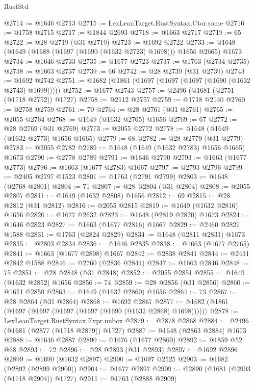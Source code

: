\begin{lexlean}{RustStd}
\begin{coremodule}
{\begin{coremodule}
{{{{{{{{{{{{{{{{{{{{{{{{{{{{{{{{{{{{{{{{{{{{@2714 := @1646 @2713
@2715 := LexLeanTarget.RustSyntax.Ctor.some
@2716 := @1758 @2715
@2717 := @1844 @2693
@2718 := @1663 @2717
@2719 := 65
@2722 := @28 @2719 (@31 @2719)
@2723 := @1692 @2722
@2733 := @1648 (@1649 (@1688 (@1697 (@1690 (@1632 @2723) @1698))) @1656 @2665) @1673
@2734 := @1646 @2733
@2735 := @1677 @2723
@2737 := @1763 (@2734 @2735)
@2738 := @1663 @2737
@2739 := 66
@2742 := @28 @2739 (@31 @2739)
@2743 := @1692 @2742
@2751 := @1682 (@1861 (@1697 (@1697 (@1697 (@1690 (@1632 @2743) @1699)))))
@2752 := @1677 @2743
@2757 := @2496 (@1681 (@2751 (@1718 @2752)) @1727)
@2758 := @2112 @2757
@2759 := @1718 @2140
@2760 := @2758 @2759
@2761 := 70
@2764 := @28 @2761 (@31 @2761)
@2765 := @2055 @2764
@2768 := @1649 (@1632 @2765) @1656
@2769 := 67
@2772 := @28 @2769 (@31 @2769)
@2773 := @2055 @2772
@2778 := @1648 (@1649 (@1632 @2773) @1656 @1665)
@2779 := 68
@2782 := @28 @2779 (@31 @2779)
@2783 := @2055 @2782
@2789 := @1648 (@1649 (@1632 @2783) @1656 @1665) @1673
@2790 := @2778 @2789
@2791 := @1646 @2790
@2793 := @1663 (@1677 @2773)
@2796 := @1663 (@1677 @2783) @1667
@2797 := @2793 @2796
@2799 := @2405 @2797 @1523
@2801 := @1763 (@2791 @2799)
@2803 := @1648 (@2768 @2801)
@2804 := 71
@2807 := @28 @2804 (@31 @2804)
@2808 := @2055 @2807
@2811 := @1649 (@1632 @2808) @1656
@2812 := 69
@2815 := @28 @2812 (@31 @2812)
@2816 := @2055 @2815
@2819 := @1649 (@1632 @2816) @1656
@2820 := @1677 @2632
@2823 := @1648 (@2819 @2820) @1673
@2824 := @1646 @2823
@2827 := @1663 (@1677 @2816) @1667
@2829 := @2460 @2827 @1588
@2831 := @1763 (@2824 @2829)
@2834 := @1648 (@2811 @2831) @1673
@2835 := @2803 @2834
@2836 := @1646 @2835
@2838 := @1663 (@1677 @2765)
@2841 := @1663 (@1677 @2808) @1667
@2842 := @2838 @2841
@2844 := @2431 @2842 @1588
@2846 := @2760 (@2836 @2844)
@2847 := @1663 @2846
@2848 := 75
@2851 := @28 @2848 (@31 @2848)
@2852 := @2055 @2851
@2855 := @1649 (@1632 @2852) @1656
@2856 := 74
@2859 := @28 @2856 (@31 @2856)
@2860 := @1651 @2859
@2863 := @1649 (@1632 @2860) @1656
@2864 := 73
@2867 := @28 @2864 (@31 @2864)
@2868 := @1692 @2867
@2877 := @1682 (@1861 (@1697 (@1697 (@1697 (@1697 (@1690 (@1632 @2868) @1698))))))
@2878 := LexLeanTarget.RustSyntax.Expr.unbox
@2879 := @2878 @2868
@2884 := @2496 (@1681 (@2877 (@1718 @2879)) @1727)
@2887 := @1648 (@2863 @2884) @1673
@2888 := @1646 @2887
@2890 := @1676 (@1677 @2860)
@2892 := @1859 @52 @68
@2893 := 72
@2896 := @28 @2893 (@31 @2893)
@2897 := @1692 @2896
@2899 := @1690 (@1632 @2897)
@2900 := @1697 @2525
@2903 := @1682 (@2892 (@2899 @2900))
@2904 := @1677 @2897
@2909 := @2890 (@1681 (@2903 (@1718 @2904)) @1727)
@2911 := @1763 (@2888 @2909)
}}}}}}}}}}}}}}}}}}}}}}}}}}}}}}}}}}}}}}}}}}}}
\end{coremodule}}
\end{coremodule}
\end{lexlean}
